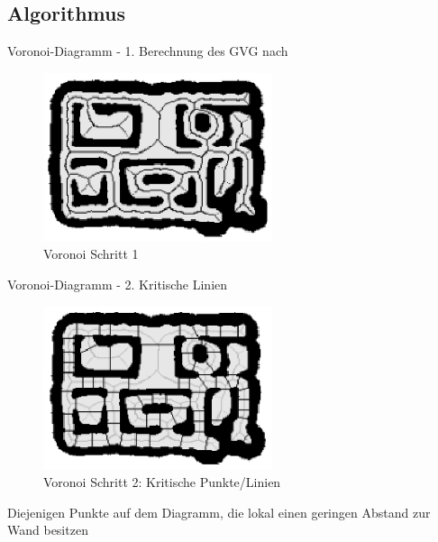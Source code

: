 \subsection{Algorithmus}
\begin{frame}{Voronoi-Diagramm - 1. Berechnung des GVG}
  nach \cite{Thrun1998}

\begin{figure}[h]
 \centering
 \includegraphics[width=0.6\textwidth]{./material/voronoi-step1.png}
 \caption{Voronoi Schritt 1 \cite{Thrun1998}}
\end{figure}

\end{frame}
\begin{frame}{Voronoi-Diagramm - 2. Kritische Linien}
\begin{figure}[h]
 \centering
 \includegraphics[width=0.6\textwidth]{./material/voronoi-step2.png}
 \caption{Voronoi Schritt 2: Kritische Punkte/Linien \cite{Thrun1998}}
\end{figure}
Diejenigen Punkte auf dem Diagramm, die lokal einen geringen Abstand zur Wand besitzen
  
\end{frame}
